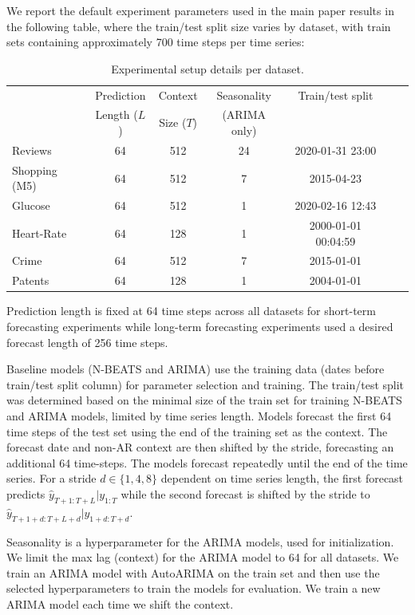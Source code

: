 \documentclass{article}
\begin{document}
We report the default experiment parameters used in the main paper results in the following table, where the train/test split size varies by dataset, with train sets containing approximately 700 time steps per time series:

\begin{table}[ht]
\centering
\caption{Experimental setup details per dataset.}
\label{tab:dataset_exp}
\begin{tabular}{lcccccc}
\toprule
 & {Prediction} & {Context} & {Seasonality} & {Train/test split}\\
 & {Length ($L$)} & {Size ($T$)} & {(ARIMA only)} & \\
 \midrule
{Reviews} & {64} & {512} & {24} & {2020-01-31 23:00} \\
{Shopping (M5)} & {64} & {512} & {7} & {2015-04-23} \\
{Glucose} & {64} & {512} & {1} & {2020-02-16 12:43} \\
{Heart-Rate} & {64} & {128} & {1} & {2000-01-01 00:04:59} \\
{Crime} & {64} & {512} & {7} & {2015-01-01} \\
{Patents} & {64} & {128} & {1} & {2004-01-01} \\
\bottomrule
\end{tabular}
\end{table}

Prediction length is fixed at 64 time steps across all datasets for short-term forecasting experiments while long-term forecasting experiments used a desired forecast length of 256 time steps. 


Baseline models (N-BEATS and ARIMA) use the training data (dates before train/test split column) for parameter selection and training. The train/test split was determined based on the minimal size of the train set for training N-BEATS and ARIMA models, limited by time series length. Models forecast the first 64 time steps of the test set using the end of the training set as the context. The forecast date and non-AR context are then shifted by the stride, forecasting an additional 64 time-steps. The models forecast repeatedly until the end of the time series. For a stride $d \in \{1,4,8\}$ dependent on time series length, the first forecast predicts $\hat{y}_{T+1:T+L}|y_{1:T}$ while the second forecast is shifted by the stride to $\hat{y}_{T+1+d:T+L+d}|y_{1+d:T+d}$.

Seasonality is a hyperparameter for the ARIMA models, used for initialization. We limit the max lag (context) for the ARIMA model to 64 for all datasets. We train an ARIMA model with AutoARIMA on the train set and then use the selected hyperparameters to train the models for evaluation. We train a new ARIMA model each time we shift the context.
\end{document}
